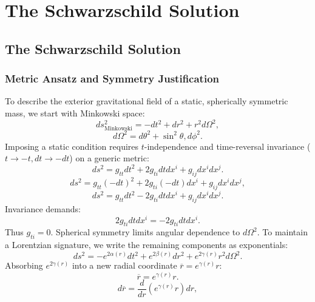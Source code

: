 \documentclass[11pt, a4paper]{report}
\begin{document}
\chapter{The Schwarzschild Solution}
\section{The Schwarzschild Solution}

\subsection{Metric Ansatz and Symmetry Justification}
To describe the exterior gravitational field of a static, spherically symmetric mass, we start with Minkowski space:
\begin{equation}
ds_{\text{Minkowski}}^2 = -dt^2 + dr^2 + r^2 d\Omega^2,
\end{equation}
\begin{equation}
d\Omega^2 = d\theta^2 + \sin^2\theta , d\phi^2.
\end{equation}
Imposing a static condition requires $t$-independence and time-reversal invariance ($t \rightarrow -t, dt \rightarrow -dt$) on a generic metric:
\begin{equation}
ds^2 = g_{tt} dt^2 + 2 g_{ti} dt dx^i + g_{ij} dx^i dx^j.
\end{equation}
\begin{equation}
ds^2 = g_{tt} (-dt)^2 + 2 g_{ti} (-dt) dx^i + g_{ij} dx^i dx^j,
\end{equation}
\begin{equation}
ds^2 = g_{tt} dt^2 - 2 g_{ti} dt dx^i + g_{ij} dx^i dx^j.
\end{equation}
Invariance demands:
\begin{equation}
2 g_{ti} dt dx^i = -2 g_{ti} dt dx^i.
\end{equation}
Thus $g_{ti} = 0$. Spherical symmetry limits angular dependence to $d\Omega^2$. To maintain a Lorentzian signature, we write the remaining components as exponentials:
\begin{equation}
ds^2 = -e^{2\alpha(r)} dt^2 + e^{2\beta(r)} dr^2 + e^{2\gamma(r)} r^2 d\Omega^2.
\end{equation}
Absorbing $e^{2\gamma(r)}$ into a new radial coordinate $\overline{r} = e^{\gamma(r)} r$:
\begin{equation}
\overline{r} = e^{\gamma(r)} r.
\end{equation}
\begin{equation}
d\overline{r} = \frac{d}{dr} \left( e^{\gamma(r)} r \right) dr,
\end{equation}
\end{document}
